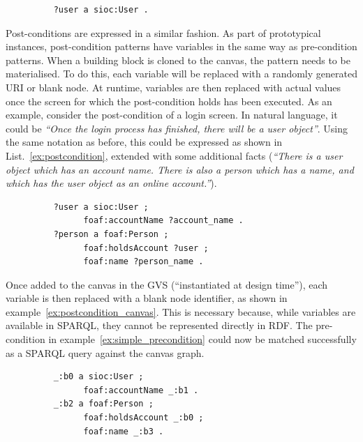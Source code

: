 \documentclass{article}
\begin{document}
\singlespacing
{}
\begin{figure}
\begin{lstlisting}
	?user a sioc:User .
\end{lstlisting}
\end{figure}
\doublespacing

Post-conditions are expressed in a similar fashion. As part of prototypical instances, post-condition patterns have variables in the same way as pre-condition patterns. When a building block is cloned to the canvas, the pattern needs to be materialised. To do this, each variable will be replaced with a randomly generated URI or blank node. At runtime, variables are then replaced with actual values once the screen for which the post-condition holds has been executed. As an example, consider the post-condition of a login screen. In natural language, it could be \emph{``Once the login process has finished, there will be a user object''}. Using the same notation as before, this could be expressed as shown in List.~\ref{ex:postcondition}, extended with some additional facts (\emph{``There is a user object which has an account name. There is also a person which has a name, and which has the user object as an online account.''}).

\singlespacing
{}
\begin{figure}
\begin{lstlisting}
	?user a sioc:User ;
	      foaf:accountName ?account_name .
	?person a foaf:Person ;
	      foaf:holdsAccount ?user ;
	      foaf:name ?person_name .
\end{lstlisting}
\end{figure}
\doublespacing

Once added to the canvas in the GVS (``instantiated at design time''), each variable is then replaced with a blank node identifier, as shown in example~\ref{ex:postcondition_canvas}. This is necessary because, while variables are available in SPARQL, they cannot be represented directly in RDF. The pre-condition in example~\ref{ex:simple_precondition} could now be matched successfully as a SPARQL query against the canvas graph.

\singlespacing
{}
\begin{figure}
\begin{lstlisting}
	_:b0 a sioc:User ;
	      foaf:accountName _:b1 .
	_:b2 a foaf:Person ;
	      foaf:holdsAccount _:b0 ;
	      foaf:name _:b3 .
\end{lstlisting}
\end{figure}
\doublespacing
\end{document}
